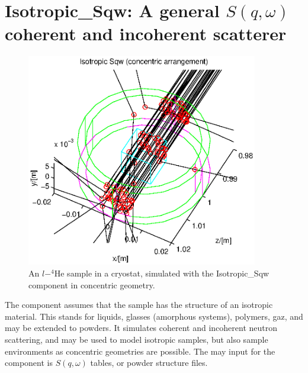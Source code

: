 \section{Isotropic\_Sqw: A general $S(q,\omega)$ coherent and incoherent scatterer}
\label{s:isotropic-sqw}


\begin{figure}
  \begin{center}
    \includegraphics[width=0.9\textwidth]{figures/sqw.eps}
  \end{center}
\caption{An $l-^4$He sample in a cryostat, simulated with the Isotropic\_Sqw component in concentric geometry.}
\label{f:isotropic-sqw}
\end{figure}

The component assumes that the sample has the structure of an isotropic material. This stands for liquids, glasses (amorphous systems), polymers, gaz, and may be extended to powders. It simulates coherent and incoherent neutron scattering, and may be used to model isotropic samples, but also sample environments as concentric geometries are possible. The may input for the component is $S(q,\omega)$ tables, or powder structure files.

